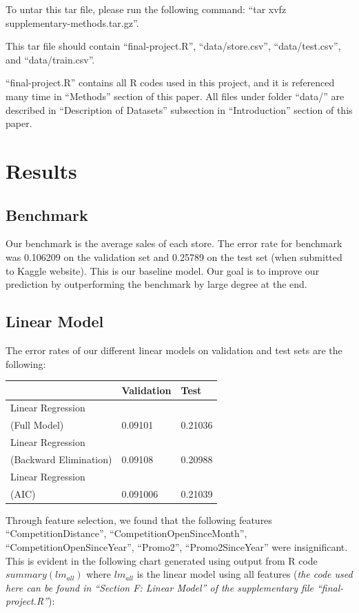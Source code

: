 \documentclass[letterpaper,twocolumn,11pt]{article}
\begin{document}
To untar this tar file, please run the following command: ``tar xvfz supplementary-methods.tar.gz''.

This tar file should contain ``final-project.R'', ``data/store.csv'', ``data/test.csv'', and ``data/train.csv''.

``final-project.R'' contains all R codes used in this project, and it is referenced many time in ``Methods'' section of this paper. All files under folder ``data/'' are described in ``Description of Datasets'' subsection in ``Introduction'' section of this paper.

\section{Results}
\subsection{Benchmark}
Our benchmark is the average sales of each store. The error rate for benchmark was 0.106209 on the validation set and 0.25789 on the test set (when submitted to Kaggle website). This is our baseline model. Our goal is to improve our prediction by outperforming the benchmark by large degree at the end. 

\subsection{Linear Model}
The error rates of our different linear models on validation and test sets are the following:

\begin{center}
    \begin{tabular}{| l | l | l |}
      \hline
       & Validation & Test \\ \hline
      Linear Regression \\
      (Full Model) & 0.09101 & 0.21036 \\ \hline
      Linear Regression \\
      (Backward Elimination) & 0.09108 & 0.20988 \\ \hline
      Linear Regression \\
      (AIC) & 0.091006 & 0.21039 \\ \hline
      \hline    
    \end{tabular}
\end{center}

Through feature selection, we found that the following features ``CompetitionDistance'', ``CompetitionOpenSinceMonth'', ``CompetitionOpenSinceYear'', ``Promo2'', ``Promo2SinceYear'' were insignificant. This is evident in the following chart generated using output from R code $summary(lm_{all})$ where $lm_{all}$ is the linear model using all features (\textit{the code used here can be found in ``Section F: Linear Model'' of the supplementary file ``final-project.R''}):
\end{document}
